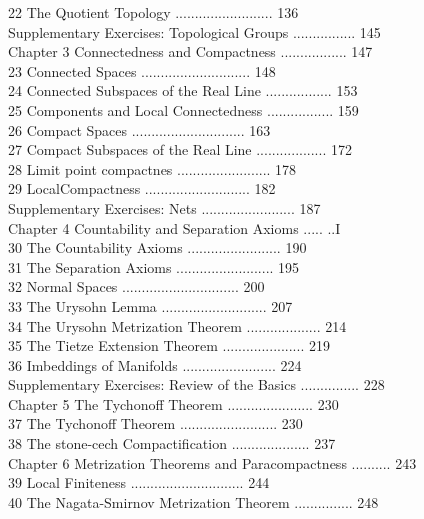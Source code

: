 22 The Quotient Topology ......................... 136 \\
Supplementary Exercises: Topological Groups ................ 145 \\
Chapter 3 Connectedness and Compactness ................. 147 \\
23 Connected Spaces ............................ 148 \\
24 Connected Subspaces of the Real Line ................. 153 \\
25 Components and Local Connectedness ................. 159 \\
26 Compact Spaces ............................. 163 \\
27 Compact Subspaces of the Real Line .................. 172 \\
28 Limit point compactnes ........................ 178 \\
29 LocalCompactness ........................... 182 \\
Supplementary Exercises: Nets ........................ 187 \\
Chapter 4 Countability and Separation Axioms ..... ..I \\
30 The Countability Axioms ........................ 190 \\
31 The Separation Axioms ......................... 195 \\
32 Normal Spaces .............................. 200 \\
33 The Urysohn Lemma ........................... 207 \\
34 The Urysohn Metrization Theorem ................... 214 \\
35 The Tietze Extension Theorem ..................... 219 \\
36 Imbeddings of Manifolds ........................ 224 \\
Supplementary Exercises: Review of the Basics ............... 228 \\
Chapter 5 The Tychonoff Theorem ...................... 230 \\
37 The Tychonoff Theorem ......................... 230 \\
38 The stone-cech Compactification .................... 237 \\
Chapter 6 Metrization Theorems and Paracompactness .......... 243 \\
39 Local Finiteness ............................. 244 \\
40 The Nagata-Smirnov Metrization Theorem ............... 248 \\
